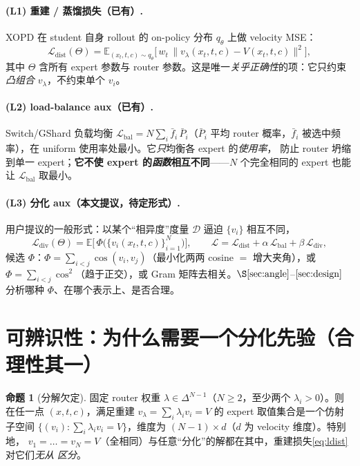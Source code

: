 \documentclass[11pt,a4paper]{article}
\newcommand{\loss}{\mathcal{L}}
\newcommand{\E}{\mathbb{E}}
\newcommand{\stu}{\theta}
\theoremstyle{definition}
\newtheorem{proposition}{命题}
\begin{document}
\paragraph{(L1) 重建 / 蒸馏损失（已有）.}
XOPD 在 student 自身 rollout 的 on-policy 分布 $q_\stu$ 上做 velocity MSE：
\begin{equation}
\loss_{\mathrm{dist}}(\Theta)=\E_{(x_t,t,c)\sim q_\stu}\Big[\,w_t\,\big\|v_\lambda(x_t,t,c)-V(x_t,t,c)\big\|^2\Big],
\label{eq:ldist}
\end{equation}
其中 $\Theta$ 含所有 expert 参数与 router 参数。这是唯一\emph{关乎正确性}的项：它只约束
\emph{凸组合} $v_\lambda$，不约束单个 $v_i$。

\paragraph{(L2) load-balance aux（已有）.}
Switch/GShard 负载均衡 $\loss_{\mathrm{bal}}=N\sum_i \bar f_i\,\bar P_i$（$\bar P_i$ 平均 router
概率，$\bar f_i$ 被选中频率），在 uniform 使用率处最小。它\emph{只}均衡各 expert 的\emph{使用率}，
防止 router 坍缩到单一 expert；\textbf{它不使 expert 的\emph{函数}相互不同}——$N$ 个完全相同的
expert 也能让 $\loss_{\mathrm{bal}}$ 取最小。

\paragraph{(L3) 分化 aux（本文提议，待定形式）.}
用户提议的一般形式：以某个``相异度''度量 $\mathcal{D}$ 逼迫 $\{v_i\}$ 相互不同，
\begin{equation}
\loss_{\mathrm{div}}(\Theta)=\E\Big[\,\Phi\big(\{v_i(x_t,t,c)\}_{i=1}^N\big)\Big],\qquad
\loss=\loss_{\mathrm{dist}}+\alpha\,\loss_{\mathrm{bal}}+\beta\,\loss_{\mathrm{div}},
\label{eq:total}
\end{equation}
候选 $\Phi$：$\Phi=\sum_{i<j}\cos(v_i,v_j)$（最小化两两 cosine $=$ 增大夹角），或
$\Phi=\sum_{i<j}\cos^2$（趋于正交），或 Gram 矩阵去相关。$\S\ref{sec:angle}$--$\ref{sec:design}$
分析哪种 $\Phi$、在哪个表示上、是否合理。

\section{可辨识性：为什么需要一个分化先验（合理性其一）}
\label{sec:ident}

\begin{proposition}[分解欠定]
\label{prop:underdetermined}
固定 router 权重 $\lambda\in\Delta^{N-1}$（$N\ge2$，至少两个 $\lambda_i>0$）。则在任一点
$(x,t,c)$，满足重建 $v_\lambda=\sum_i\lambda_i v_i=V$ 的 expert 取值集合是一个仿射子空间
$\{(v_i):\sum_i\lambda_i v_i=V\}$，维度为 $(N-1)\times d$（$d$ 为 velocity 维度）。特别地，
$v_1=\dots=v_N=V$（全相同）与任意``分化''的解都在其中，重建损失\eqref{eq:ldist} 对它们\emph{无从
区分}。
\end{proposition}
\end{document}
